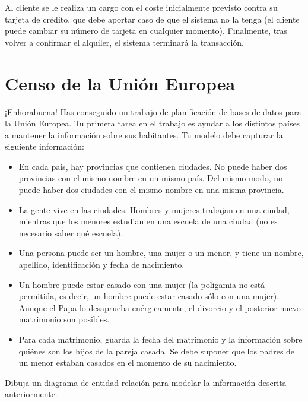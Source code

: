 \documentclass{db-practice}
\begin{document}
Al cliente se le realiza un cargo con el coste inicialmente previsto contra su tarjeta de crédito, que debe aportar caso de que el sistema no la tenga (el cliente puede cambiar su número de tarjeta en cualquier momento). Finalmente, tras volver a confirmar el alquiler, el sistema terminará la transacción.

\section{Censo de la Unión Europea}
¡Enhorabuena! Has conseguido un trabajo de planificación de bases de datos para la Unión Europea. Tu primera tarea en el trabajo es ayudar a los distintos países a mantener la información sobre sus habitantes. Tu modelo debe capturar la siguiente información:
\begin{itemize}
    \item En cada país, hay provincias que contienen ciudades. No puede haber dos provincias con el mismo nombre en un mismo país. Del mismo modo, no puede haber dos ciudades con el mismo nombre en una misma provincia.
    \item La gente vive en las ciudades. Hombres y mujeres trabajan en una ciudad, mientras que los menores estudian en una escuela de una ciudad (no es necesario saber qué escuela).
    \item Una persona puede ser un hombre, una mujer o un menor, y tiene un nombre, apellido, identificación y fecha de nacimiento.
    \item Un hombre puede estar casado con una mujer (la poligamia no está permitida, es decir, un hombre puede estar casado sólo con una mujer). Aunque el Papa lo desaprueba enérgicamente, el divorcio y el posterior nuevo matrimonio son posibles.
    \item Para cada matrimonio, guarda la fecha del matrimonio y la información sobre quiénes son los hijos de la pareja casada. Se debe suponer que los padres de un menor estaban casados en el momento de su nacimiento.
\end{itemize}

Dibuja un diagrama de entidad-relación para modelar la información descrita anteriormente.
\end{document}
